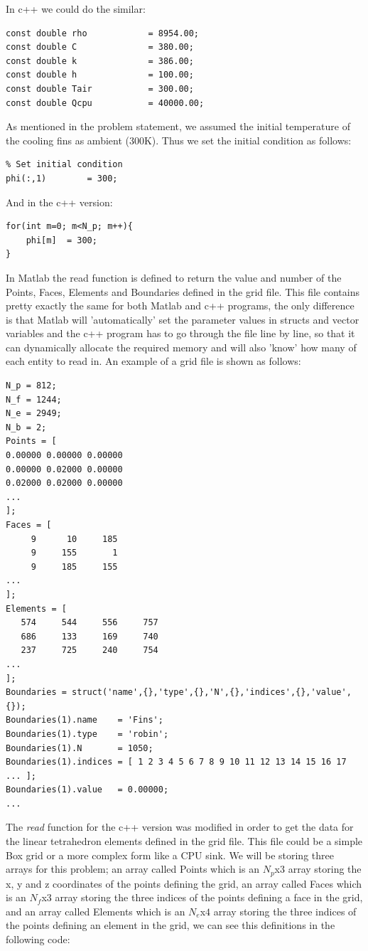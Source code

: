 \documentclass[12pt]{article}
\begin{document}
In c++ we could do the similar:

\begin{lstlisting}[style=MyC++Style]
const double rho            = 8954.00;
const double C              = 380.00;
const double k              = 386.00;
const double h              = 100.00;
const double Tair           = 300.00;
const double Qcpu           = 40000.00;
\end{lstlisting}

As mentioned in the problem statement, we assumed the initial temperature of the cooling fins as ambient (300K). Thus we set the initial condition as follows:

\begin{lstlisting}
% Set initial condition
phi(:,1)        = 300;
\end{lstlisting}

And in the c++ version:

\begin{lstlisting}[style=MyC++Style]
for(int m=0; m<N_p; m++){
	phi[m]	= 300;
}
\end{lstlisting}

In Matlab the read function is defined to return the value and number of the Points, Faces, Elements and Boundaries defined in the grid file. This file contains pretty exactly the same for both Matlab and c++ programs, the only difference is that Matlab will 'automatically' set the parameter values in structs and vector variables and the c++ program has to go through the file line by line, so that it can dynamically allocate the required memory and will also 'know' how many of each entity to read in. An example of a grid file is shown as follows:

\begin{lstlisting}
N_p = 812;
N_f = 1244;
N_e = 2949;
N_b = 2;
Points = [
0.00000	0.00000	0.00000
0.00000	0.02000	0.00000
0.02000	0.02000	0.00000
...
];
Faces = [
     9	    10	   185
     9	   155	     1
     9	   185	   155
...
];
Elements = [
   574	   544	   556	   757
   686	   133	   169	   740
   237	   725	   240	   754
...
];
Boundaries = struct('name',{},'type',{},'N',{},'indices',{},'value',{});
Boundaries(1).name    = 'Fins';
Boundaries(1).type    = 'robin';
Boundaries(1).N       = 1050;
Boundaries(1).indices = [ 1 2 3 4 5 6 7 8 9 10 11 12 13 14 15 16 17 ... ];
Boundaries(1).value   = 0.00000;
...
\end{lstlisting}

The \textit{read} function for the c++ version was modified in order to get the data for the linear tetrahedron elements defined in the grid file. This file could be a simple Box grid or a more complex form like a CPU sink. We will be storing three arrays for this problem; an array called Points which is an $N_p$x$3$ array storing the x, y and z coordinates of the points defining the grid, an array called Faces which is an $N_f$x$3$ array storing the three indices of the points defining a face in the grid, and an array called Elements which is an $N_e$x$4$ array storing the three indices of the points defining an element in the grid, we can see this definitions in the following code:
\end{document}
